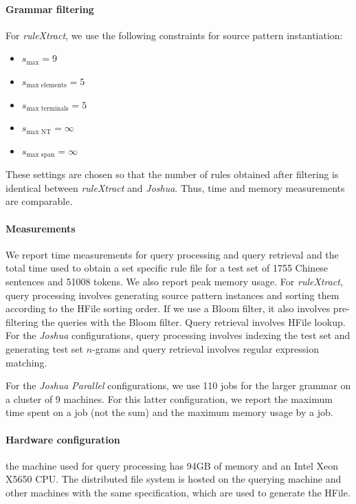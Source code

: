 \paragraph{Grammar filtering} For \emph{ruleXtract}, we use the following constraints for
    source pattern instantiation: 
    \begin{itemize}
      \item $ s_{\text{max}} = 9$
      \item $s_{\text{max elements}} = 5$
      \item $s_{\text{max terminals}} = 5$ %
      \item $s_{\text{max NT}} = \infty$
      \item $s_{\text{max span}} = \infty$ %
    \end{itemize}
    These settings are chosen so that the number of rules obtained after filtering is identical between
    \emph{ruleXtract} and \emph{Joshua}. Thus, time and memory measurements
    are comparable. %
%
\paragraph{Measurements} We report time measurements for query processing and query
    retrieval and the total time used to obtain a set specific rule file for a
    test set of 1755 Chinese sentences and 51008 tokens. We also report peak
    memory usage. For \emph{ruleXtract}, query processing involves generating
    source pattern instances and sorting them according to the HFile sorting order.
    If we use a Bloom filter, it also involves pre-filtering the queries with
    the Bloom filter. Query retrieval involves HFile lookup. For the
    \emph{Joshua} configurations, query processing involves indexing the test
    set and generating test set $n$-grams and query retrieval involves regular
    expression matching.

    For the \emph{Joshua Parallel}
    configurations, we use 110 jobs for the larger grammar on a cluster of 9
    machines. For this latter configuration, we report the maximum time spent on
    a job (not the sum) and the maximum memory usage by a job.
%
\paragraph{Hardware configuration} the machine used for query processing has 94GB of
    memory and an Intel Xeon X5650 CPU. The distributed file system is hosted on
    the querying machine and other machines with the same specification, which
    are used to generate the HFile.

